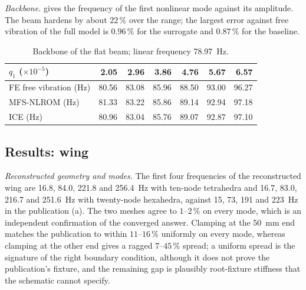 \emph{Backbone.}  gives the frequency of the first nonlinear mode against its amplitude. The beam hardens by about $22\,\%$ over the range; the largest error against free vibration of the full model is $0.96\,\%$ for the surrogate and $0.87\,\%$ for the baseline.

\begin{table}[tbp]
\centering\footnotesize
\caption{Backbone of the flat beam; linear frequency 78.97~Hz.}\label{tab:vf-mfs-back}
\begin{tabular}{@{}lrrrrrr@{}}
\toprule
$q_1$ ($\times10^{-5}$) & 2.05 & 2.96 & 3.86 & 4.76 & 5.67 & 6.57\\
\midrule
FE free vibration (Hz) & 80.56 & 83.08 & 85.96 & 88.50 & 93.00 & 96.27\\
MFS-NLROM (Hz) & 81.33 & 83.22 & 85.86 & 89.14 & 92.94 & 97.18\\
ICE (Hz) & 80.96 & 83.04 & 85.76 & 89.07 & 92.87 & 97.10\\
\bottomrule
\end{tabular}
\end{table}

\subsection*{Results: wing}

\emph{Reconstructed geometry and modes.} The first four frequencies of the reconstructed wing are 16.8, 84.0, 221.8 and 256.4~Hz with ten-node tetrahedra and 16.7, 83.0, 216.7 and 251.6~Hz with twenty-node hexahedra, against 15, 73, 191 and 223~Hz in the publication (a). The two meshes agree to $1$--$2\,\%$ on every mode, which is an independent confirmation of the converged answer. Clamping at the 50~mm end matches the publication to within $11$--$16\,\%$ uniformly on every mode, whereas clamping at the other end gives a ragged $7$--$45\,\%$ spread; a uniform spread is the signature of the right boundary condition, although it does not prove the publication's fixture, and the remaining gap is plausibly root-fixture stiffness that the schematic cannot specify.

